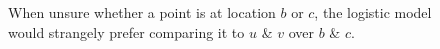 \documentclass{article}
\begin{document}
\begin{figure}
 \caption{\label{fig:exp} When unsure whether a point is at location $b$ or $c$, the logistic model would strangely prefer comparing it to $u$ \& $v$ over $b$ \& $c$.}
\end{figure}
\end{document}
